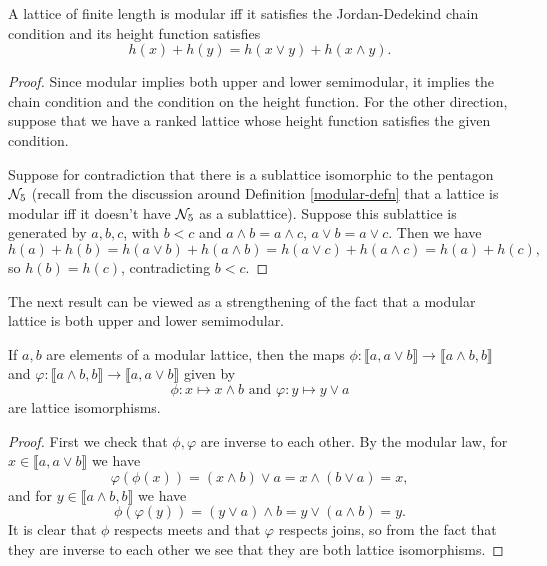 \documentclass[letterpaper,11pt]{article}
\begin{document}
\begin{thm} A lattice of finite length is modular iff it satisfies the Jordan-Dedekind chain condition and its height function satisfies
\[
h(x) + h(y) = h(x\vee y) + h(x \wedge y).
\]
\end{thm}
\begin{proof} Since modular implies both upper and lower semimodular, it implies the chain condition and the condition on the height function. For the other direction, suppose that we have a ranked lattice whose height function satisfies the given condition.

Suppose for contradiction that there is a sublattice isomorphic to the pentagon $\mathcal{N}_5$ (recall from the discussion around Definition \ref{modular-defn} that a lattice is modular iff it doesn't have $\mathcal{N}_5$ as a sublattice). Suppose this sublattice is generated by $a,b,c$, with $b < c$ and $a \wedge b = a \wedge c$, $a \vee b = a \vee c$. Then we have
\[
h(a) + h(b) = h(a\vee b) + h(a \wedge b) = h(a\vee c) + h(a \wedge c) = h(a) + h(c),
\]
so $h(b) = h(c)$, contradicting $b < c$.
\end{proof}

The next result can be viewed as a strengthening of the fact that a modular lattice is both upper and lower semimodular.%

\begin{thm}\label{diamond-isom-lattice} If $a,b$ are elements of a modular lattice, then the maps $\phi : \llbracket a, a\vee b\rrbracket \rightarrow \llbracket a\wedge b, b\rrbracket$ and $\varphi: \llbracket a\wedge b, b\rrbracket \rightarrow \llbracket a, a \vee b\rrbracket$ given by
\[
\phi : x \mapsto x\wedge b \text{ and } \varphi : y \mapsto y\vee a
\]
are lattice isomorphisms.
\end{thm}
\begin{proof} First we check that $\phi, \varphi$ are inverse to each other. By the modular law, for $x \in \llbracket a, a \vee b \rrbracket$ we have
\[
\varphi(\phi(x)) = (x \wedge b) \vee a = x \wedge (b \vee a) = x,
\]
and for $y \in \llbracket a \wedge b, b \rrbracket$ we have
\[
\phi(\varphi(y)) = (y \vee a) \wedge b = y \vee (a \wedge b) = y.
\]
It is clear that $\phi$ respects meets and that $\varphi$ respects joins, so from the fact that they are inverse to each other we see that they are both lattice isomorphisms.
\end{proof}
\end{document}
